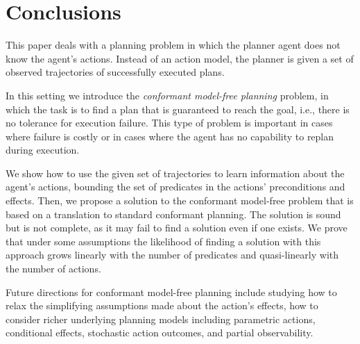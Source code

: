 \documentclass[letterpaper]{article}
\begin{document}
\section{Conclusions}
This paper deals with a planning problem in which the planner agent does not know the agent's actions. Instead of an action model, the planner is given a set of observed trajectories of successfully executed plans. 


In this setting we introduce the {\em conformant model-free planning} problem, in which the task is to find a plan that is guaranteed to reach the goal, i.e., there is no tolerance for execution failure. This type of problem is important in cases where failure is costly or in cases where the agent has no capability to replan during execution. 


We show how to use the given set of trajectories to learn
information about the agent's actions, bounding the set of predicates in the actions'  preconditions and effects. Then, we propose a solution to the conformant model-free problem that is based on a translation to standard conformant planning. The solution is sound but is not complete, as it may fail to find a solution even if one exists. We prove that under some assumptions the likelihood of finding a solution with this approach grows linearly with the number of predicates and quasi-linearly with the number of actions. 


Future directions for conformant model-free planning include studying how to relax the simplifying assumptions made about the action's effects, how to consider richer underlying planning models including parametric actions, conditional effects, stochastic action outcomes, and partial observability.  



\newpage



\end{document}
